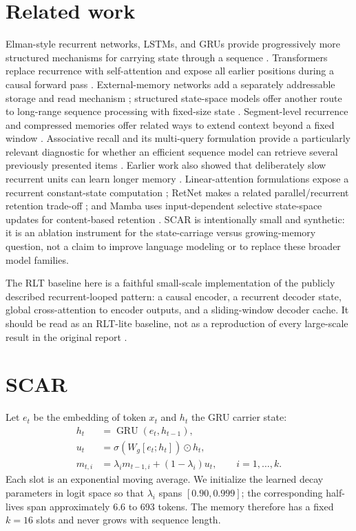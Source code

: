 \documentclass{article}
\begin{document}
\section{Related work}
Elman-style recurrent networks, LSTMs, and GRUs provide progressively more
structured mechanisms for carrying state through a sequence
\cite{elman1990,hochreiter1997,cho2014}. Transformers replace recurrence with
self-attention and expose all earlier positions during a causal forward pass
\cite{vaswani2017}. External-memory networks add a separately addressable
storage and read mechanism \cite{sukhbaatar2015}; structured state-space
models offer another route to long-range sequence processing with fixed-size
state \cite{gu2022s4}. Segment-level recurrence and compressed memories offer
related ways to extend context beyond a fixed window
\cite{dai2019transformerxl,rae2020compressive}. Associative recall and its
multi-query formulation provide a particularly relevant diagnostic for whether
an efficient sequence model can retrieve several previously presented items
\cite{arora2023zoology}. Earlier work also showed that deliberately slow
recurrent units can learn longer memory \cite{mikolov2015longmemory}.
Linear-attention formulations expose a recurrent constant-state computation
\cite{katharopoulos2020linear}; RetNet makes a related parallel/recurrent
retention trade-off \cite{sun2023retnet}; and Mamba uses input-dependent
selective state-space updates for content-based retention \cite{gu2024mamba}.
SCAR is intentionally small and synthetic: it is an ablation instrument for
the state-carriage versus growing-memory question, not a claim to improve
language modeling or to replace these broader model families.

The RLT baseline here is a faithful small-scale implementation of the
publicly described recurrent-looped pattern: a causal encoder, a recurrent
decoder state, global cross-attention to encoder outputs, and a sliding-window
decoder cache. It should be read as an RLT-lite baseline, not as a reproduction
of every large-scale result in the original report \cite{zhang2026rlt}.

\section{SCAR}
Let $e_t$ be the embedding of token $x_t$ and $h_t$ the GRU carrier state:
\begin{align}
h_t &= \operatorname{GRU}(e_t,h_{t-1}),\\
u_t &= \sigma(W_g[e_t;h_t])\odot h_t,\\
m_{t,i} &= \lambda_i m_{t-1,i} + (1-\lambda_i)u_t,
\qquad i=1,\ldots,k.
\end{align}
Each slot is an exponential moving average. We initialize the learned decay
parameters in logit space so that $\lambda_i$ spans $[0.90,0.999]$; the
corresponding half-lives span approximately 6.6 to 693 tokens. The memory
therefore has a fixed $k=16$ slots and never grows with sequence length.
\end{document}
